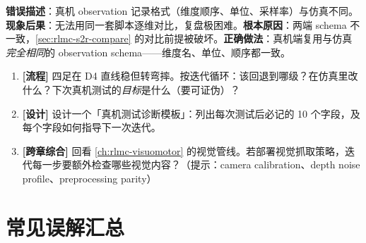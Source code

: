 \begin{pitfall}[真机日志格式与仿真日志不兼容]
\textbf{错误描述}：真机 observation 记录格式（维度顺序、单位、采样率）与仿真不同。\textbf{现象后果}：无法用同一套脚本逐维对比，复盘极困难。\textbf{根本原因}：两端 schema 不一致，\cref{sec:rlmc-s2r-compare} 的对比前提被破坏。\textbf{正确做法}：真机端复用与仿真\emph{完全相同}的 observation schema——维度名、单位、顺序都一致。
\end{pitfall}

\begin{practice}
\begin{enumerate}
  \item \textbf{[流程]} 四足在 D4 直线稳但转弯摔。按迭代循环：该回退到哪级？在仿真里改什么？下次真机测试的\emph{目标}是什么（要可证伪）？
  \item \textbf{[设计]} 设计一个「真机测试诊断模板」：列出每次测试后必记的 10 个字段，及每个字段如何指导下一次迭代。
  \item \textbf{[跨章综合]} 回看 \cref{ch:rlmc-visuomotor} 的视觉管线。若部署视觉抓取策略，迭代每一步要额外检查哪些视觉内容？（提示：camera calibration、depth noise profile、preprocessing parity）
\end{enumerate}
\end{practice}

\section{常见误解汇总}
\label{sec:rlmc-s2r-misconceptions}

